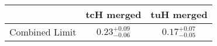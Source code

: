 \centering
\begin{tabular}{|c|c|c|} \hline
 & tcH merged & tuH merged\\\hline
Combined Limit & $0.23^{+0.09}_{-0.06}$ & $0.17^{+0.07}_{-0.05}$\\\hline
\end{tabular}
